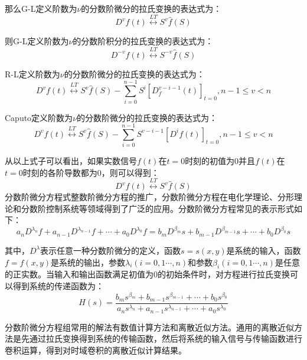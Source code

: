 \begin{enumerate}
那么G-L定义阶数为$\nu $的分数阶微分的拉氏变换的表达式为：
\begin{equation}
{{D}^{v}}f(t)\overset{LT}{\longleftrightarrow}{{S}^{v}}\widehat{f}\left( S \right)
\end{equation}

则G-L定义阶数为$\nu $的分数阶积分的拉氏变换的表达式为：
\begin{equation}
{{D}^{-v}}f(t)\overset{LT}{\longleftrightarrow}{{S}^{-v}}\widehat{f}\left( S \right)
\end{equation}
	 
R-L定义阶数为$\nu $的分数阶微分的拉氏变换的表达式为：
\begin{equation}
{{D}^{v}}f(t)\overset{LT}{\longleftrightarrow}{{S}^{v}}\widehat{f}\left( S \right)-\sum\limits_{i=0}^{n-1}{{{S}^{i}}{{\left[ D_{f}^{v-i-1}\left( t \right) \right]}_{t=0}},n-1\le v<n}
\end{equation}
	 
Caputo定义阶数为$\nu $的分数阶微分的拉氏变换的表达式为：
\begin{equation}
{{D}^{v}}f(t)\overset{LT}{\longleftrightarrow}{{S}^{v}}\widehat{f}\left( S \right)-\sum\limits_{i=0}^{n-1}{{{S}^{v-i-1}}{{\left[ {{D}^{i}}f\left( t \right) \right]}_{t=0}},n-1\le v<n}
\end{equation}
	 
从以上式子可以看出，如果实数信号$f(t)$在$t=0$时刻的初值为0并且$f(t)$在$t=0$时刻的各阶导数都为0，则可以得到：
\begin{equation}
{{D}^{v}}f(t)\overset{LT}{\longleftrightarrow}{{S}^{v}}\widehat{f}\left( S \right)
\end{equation}
分数阶微分方程式整数阶微分方程的推广，分数阶微分方程在电化学理论、分形理论和分数阶控制系统等领域得到了广泛的应用。分数阶微分方程常见的表示形式如下：
\begin{equation}
{{a}_{n}}{{D}^{{{\lambda }_{n}}}}f+{{a}_{n-1}}{{D}^{{{\lambda }_{n-1}}}}f+\cdots +{{a}_{0}}{{D}^{{{\lambda }_{0}}}}f={{b}_{m}}{{D}^{{{\beta }_{m}}}}s+{{b}_{m-1}}{{D}^{{{\beta }_{m-1}}}}s+\cdots +{{b}_{0}}{{D}^{{{\beta }_{0}}}}s
\end{equation}

其中，${{D}^{\lambda }}$表示任意一种分数阶微分的定义，函数$s=s\left( x,y \right)$是系统的输入，函数$f=f\left( x,y \right)$是系统的输出，参数${{\lambda }_{i}}\left( i=0,1\cdots ,n \right)$和参数${{\beta }_{i}}\left( i=0,1\cdots ,n \right)$是任意的正实数。当输入和输出函数满足初值为0的初始条件时，对方程进行拉氏变换可以得到系统的传递函数为：
\begin{equation}
H\left( s \right)=\frac{{{b}_{m}}{{s}^{{{\beta }_{m}}}}+{{b}_{m-1}}{{s}^{{{\beta }_{m-1}}}}+\cdots +{{b}_{0}}{{s}^{{{\beta }_{0}}}}}{{{a}_{n}}{{s}^{{{\lambda }_{n}}}}+{{a}_{n-1}}{{s}^{{{\lambda }_{n-1}}}}+\cdots +{{a}_{0}}{{s}^{{{\lambda }_{0}}}}}
\end{equation}

分数阶微分方程组常用的解法有数值计算方法和离散近似方法。通用的离散近似方法是先通过拉氏变换得到系统的传输函数，然后将系统的输入信号与传输函数进行卷积运算，得到对时域卷积的离散近似计算结果。
\end{enumerate}
